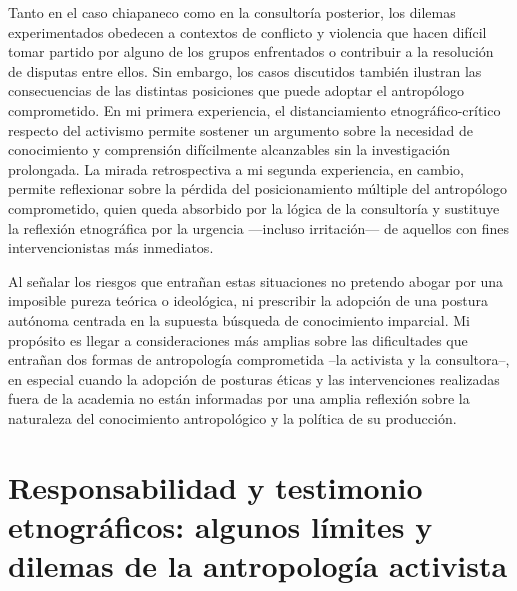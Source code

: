 \documentclass[
  spanish,
  11pt,
  a4paper,
]{scrbook}
\begin{document}
Tanto en el caso chiapaneco como en la consultoría posterior, los
dilemas experimentados obedecen a contextos de conflicto y violencia que
hacen difícil tomar partido por alguno de los grupos enfrentados o
contribuir a la resolución de disputas entre ellos. Sin embargo, los
casos discutidos también ilustran las consecuencias de las distintas
posiciones que puede adoptar el antropólogo comprometido. En mi primera
experiencia, el distanciamiento etnográfico-crítico respecto del
activismo permite sostener un argumento sobre la necesidad de
conocimiento y comprensión difícilmente alcanzables sin la investigación
prolongada. La mirada retrospectiva a mi segunda experiencia, en cambio,
permite reflexionar sobre la pérdida del posicionamiento múltiple del
antropólogo comprometido, quien queda absorbido por la lógica de la
consultoría y sustituye la reflexión etnográfica por la urgencia
---incluso irritación--- de aquellos con fines intervencionistas más
inmediatos.

Al señalar los riesgos que entrañan estas situaciones no pretendo abogar
por una imposible pureza teórica o ideológica, ni prescribir la adopción
de una postura autónoma centrada en la supuesta búsqueda de conocimiento
imparcial. Mi propósito es llegar a consideraciones más amplias sobre
las dificultades que entrañan dos formas de antropología comprometida
--la activista y la consultora--, en especial cuando la adopción de
posturas éticas y las intervenciones realizadas fuera de la academia no
están informadas por una amplia reflexión sobre la naturaleza del
conocimiento antropológico y la política de su producción.

\section*{Responsabilidad y testimonio etnográficos: algunos límites y
dilemas de la antropología
activista}\label{responsabilidad-y-testimonio-etnogruxe1ficos-algunos-luxedmites-y-dilemas-de-la-antropologuxeda-activista}

\end{document}
